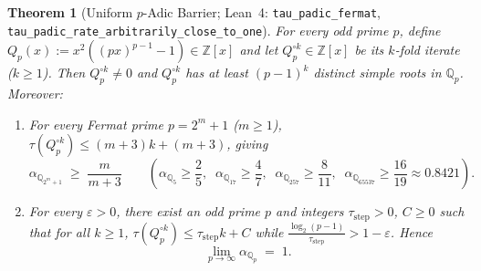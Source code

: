 \documentclass[11pt]{article}
\newtheorem{theorem}{Theorem}[section]
\newcommand{\Z}{\mathbb{Z}}
\newcommand{\Q}{\mathbb{Q}}
\newcommand{\code}[1]{\texttt{#1}}
\begin{document}
\begin{theorem}[Uniform $p$-Adic Barrier; Lean~4: \code{tau\_padic\_fermat}, \code{tau\_padic\_rate\_}\allowbreak\code{arbitrarily\_close\_to\_one}]
\label{thm:uniform-padic}
For every odd prime $p$, define $Q_p(x) := x^2((px)^{p-1} - 1) \in \Z[x]$ and let $Q_p^{\circ k} \in \Z[x]$ be its $k$-fold iterate ($k \ge 1$). Then $Q_p^{\circ k} \neq 0$ and $Q_p^{\circ k}$ has at least $(p - 1)^k$ distinct simple roots in $\Q_p$. Moreover:
\begin{enumerate}[label=(\alph*),leftmargin=1.8em]
  \item For every Fermat prime $p = 2^m + 1$ ($m \ge 1$), $\tau(Q_p^{\circ k}) \le (m + 3)k + (m + 3)$, giving
  \[
    \alpha_{\Q_{2^m+1}} \;\ge\; \frac{m}{m + 3} \qquad \left(\alpha_{\Q_5} \ge \frac{2}{5},\;\; \alpha_{\Q_{17}} \ge \frac{4}{7},\;\; \alpha_{\Q_{257}} \ge \frac{8}{11},\;\; \alpha_{\Q_{65537}} \ge \frac{16}{19} \approx 0.8421\right).
  \]
  \item For every $\varepsilon > 0$, there exist an odd prime $p$ and integers $\tau_{\mathrm{step}} > 0$, $C \ge 0$ such that for all $k \ge 1$, $\tau(Q_p^{\circ k}) \le \tau_{\mathrm{step}} k + C$ while $\frac{\log_2(p - 1)}{\tau_{\mathrm{step}}} > 1 - \varepsilon$. Hence
  \[
    \lim_{p \to \infty} \alpha_{\Q_p} \;=\; 1.
  \]
\end{enumerate}
\end{theorem}
\end{document}
